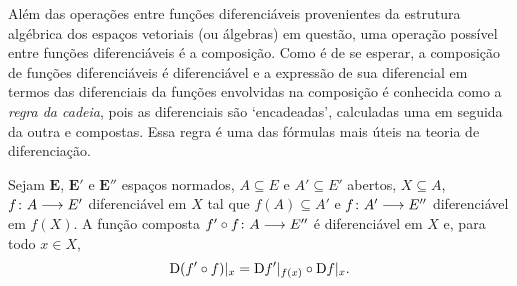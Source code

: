 Além das operações entre funções diferenciáveis provenientes da estrutura algébrica dos espaços vetoriais (ou álgebras) em questão, uma operação possível entre funções diferenciáveis é a composição. Como é de se esperar, a composição de funções diferenciáveis é diferenciável e a expressão de sua diferencial em termos das diferenciais da funções envolvidas na composição é conhecida como a \textit{regra da cadeia}, pois as diferenciais são `encadeadas', calculadas uma em seguida da outra e compostas. Essa regra é uma das fórmulas mais úteis na teoria de diferenciação.

\begin{proposition}
\label{prop:diferenciabilidade.composicao}
Sejam $\bm E$, $\bm E'$ e $\bm E''$ espaços normados, $A \subseteq E$ e $A' \subseteq E'$ abertos, $X \subseteq A$, $f\colon \allowbreak A \longrightarrow E'$ diferenciável em $X$ tal que $f(A) \subseteq A'$ e $f\colon \allowbreak A' \longrightarrow E''$ diferenciável em $f(X)$. A função composta $f' \circ f\colon \allowbreak A \longrightarrow E''$ é diferenciável em $X$ e, para todo $x \in X$,
	\begin{equation*}
	\mathrm{D}(f' \circ f)|_x = \mathrm{D} f'|_{f(x)} \circ \mathrm{D} f|_x.
	\end{equation*}
\end{proposition}

